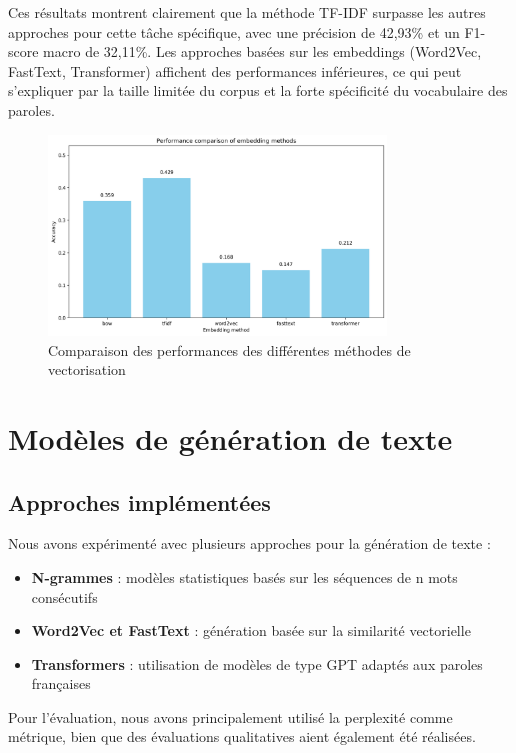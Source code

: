 \documentclass[a4paper,11pt]{article}
\begin{document}
Ces résultats montrent clairement que la méthode TF-IDF surpasse les autres approches pour cette tâche spécifique, avec une précision de 42,93\% et un F1-score macro de 32,11\%. Les approches basées sur les embeddings (Word2Vec, FastText, Transformer) affichent des performances inférieures, ce qui peut s'expliquer par la taille limitée du corpus et la forte spécificité du vocabulaire des paroles.

\begin{figure}[ht]
    \centering
    \includegraphics[width=0.8\textwidth]{results_rapport/embedding_accuracy_comparison.png}
    \caption{Comparaison des performances des différentes méthodes de vectorisation}
    \label{fig:embedding-comparison}
\end{figure}

\section{Modèles de génération de texte}
\label{sec:generation}

\subsection{Approches implémentées}
Nous avons expérimenté avec plusieurs approches pour la génération de texte :

\begin{itemize}
    \item \textbf{N-grammes} : modèles statistiques basés sur les séquences de n mots consécutifs
    \item \textbf{Word2Vec et FastText} : génération basée sur la similarité vectorielle
    \item \textbf{Transformers} : utilisation de modèles de type GPT adaptés aux paroles françaises
\end{itemize}

Pour l'évaluation, nous avons principalement utilisé la perplexité comme métrique, bien que des évaluations qualitatives aient également été réalisées.
\end{document}
